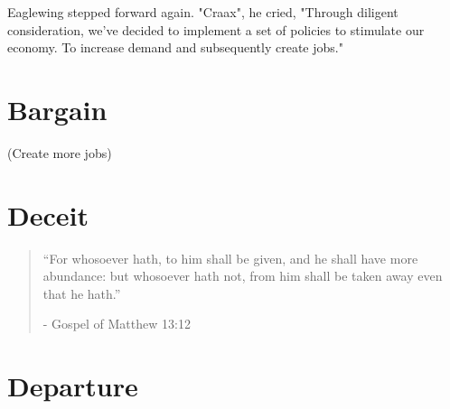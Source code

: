 \documentclass[smalldemyvopaper,11pt,twoside,onecolumn,openright,extrafontsizes]{memoir}
\begin{document}
Eaglewing stepped forward again. "Craax", he cried, "Through diligent consideration, we've decided to implement a set of policies to stimulate our economy. To increase demand and subsequently create jobs."







\chapter{Bargain}


(Create more jobs)

\chapter{Deceit}


\vspace{-1.3cm}
\begin{localsize}{10}
	\begin{quote}
		“For whosoever hath, to him shall be given, and he shall have more abundance: but whosoever hath not, from him shall be taken away even that he hath.”
		\begin{flushright}- Gospel of Matthew 13:12 \end{flushright}
	\end{quote} 
\end{localsize}
\vspace{1cm}


\chapter{Departure}
\end{document}
